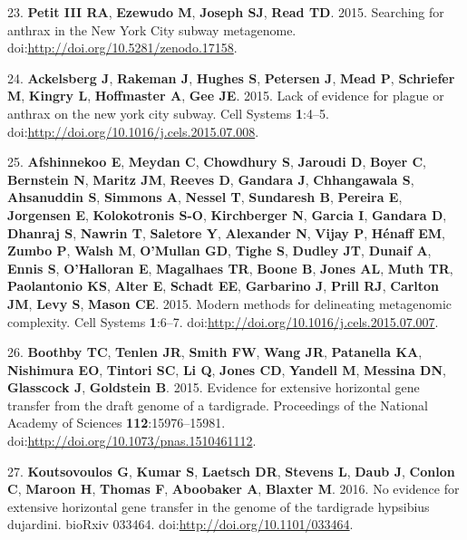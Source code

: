 \documentclass[11pt,]{article}
\begin{document}
23. \textbf{Petit III RA}, \textbf{Ezewudo M}, \textbf{Joseph SJ},
\textbf{Read TD}. 2015. Searching for anthrax in the New York City
subway metagenome. doi:\url{http://doi.org/10.5281/zenodo.17158}.

24. \textbf{Ackelsberg J}, \textbf{Rakeman J}, \textbf{Hughes S},
\textbf{Petersen J}, \textbf{Mead P}, \textbf{Schriefer M},
\textbf{Kingry L}, \textbf{Hoffmaster A}, \textbf{Gee JE}. 2015. Lack of
evidence for plague or anthrax on the new york city subway. Cell Systems
\textbf{1}:4--5. doi:\url{http://doi.org/10.1016/j.cels.2015.07.008}.

25. \textbf{Afshinnekoo E}, \textbf{Meydan C}, \textbf{Chowdhury S},
\textbf{Jaroudi D}, \textbf{Boyer C}, \textbf{Bernstein N},
\textbf{Maritz JM}, \textbf{Reeves D}, \textbf{Gandara J},
\textbf{Chhangawala S}, \textbf{Ahsanuddin S}, \textbf{Simmons A},
\textbf{Nessel T}, \textbf{Sundaresh B}, \textbf{Pereira E},
\textbf{Jorgensen E}, \textbf{Kolokotronis S-O}, \textbf{Kirchberger N},
\textbf{Garcia I}, \textbf{Gandara D}, \textbf{Dhanraj S},
\textbf{Nawrin T}, \textbf{Saletore Y}, \textbf{Alexander N},
\textbf{Vijay P}, \textbf{Hénaff EM}, \textbf{Zumbo P}, \textbf{Walsh
M}, \textbf{O'Mullan GD}, \textbf{Tighe S}, \textbf{Dudley JT},
\textbf{Dunaif A}, \textbf{Ennis S}, \textbf{O'Halloran E},
\textbf{Magalhaes TR}, \textbf{Boone B}, \textbf{Jones AL}, \textbf{Muth
TR}, \textbf{Paolantonio KS}, \textbf{Alter E}, \textbf{Schadt EE},
\textbf{Garbarino J}, \textbf{Prill RJ}, \textbf{Carlton JM},
\textbf{Levy S}, \textbf{Mason CE}. 2015. Modern methods for delineating
metagenomic complexity. Cell Systems \textbf{1}:6--7.
doi:\url{http://doi.org/10.1016/j.cels.2015.07.007}.

26. \textbf{Boothby TC}, \textbf{Tenlen JR}, \textbf{Smith FW},
\textbf{Wang JR}, \textbf{Patanella KA}, \textbf{Nishimura EO},
\textbf{Tintori SC}, \textbf{Li Q}, \textbf{Jones CD}, \textbf{Yandell
M}, \textbf{Messina DN}, \textbf{Glasscock J}, \textbf{Goldstein B}.
2015. Evidence for extensive horizontal gene transfer from the draft
genome of a tardigrade. Proceedings of the National Academy of Sciences
\textbf{112}:15976--15981.
doi:\url{http://doi.org/10.1073/pnas.1510461112}.

27. \textbf{Koutsovoulos G}, \textbf{Kumar S}, \textbf{Laetsch DR},
\textbf{Stevens L}, \textbf{Daub J}, \textbf{Conlon C}, \textbf{Maroon
H}, \textbf{Thomas F}, \textbf{Aboobaker A}, \textbf{Blaxter M}. 2016.
No evidence for extensive horizontal gene transfer in the genome of the
tardigrade hypsibius dujardini. bioRxiv 033464.
doi:\url{http://doi.org/10.1101/033464}.
\end{document}
